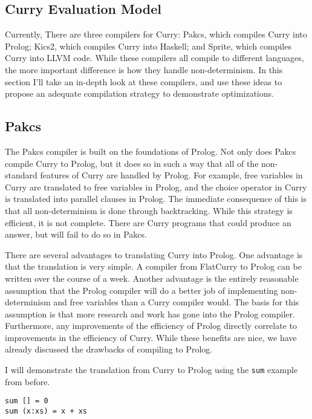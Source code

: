 
\subsection{Curry Evaluation Model}

Currently, There are three compilers for Curry:
Pakcs, which compiles Curry into Prolog;
Kics2, which compiles Curry into Haskell;
and Sprite, which compiles Curry into LLVM code.
While these compilers all compile to different languages,
the more important difference is how they handle non-determinism.
In this section I'll take an in-depth look at these compilers,
and use these ideas to propose an adequate compilation strategy
to demonstrate optimizations.

\subsection{Pakcs}

The Pakcs compiler is built on the foundations of Prolog.
Not only does Pakcs compile Curry to Prolog,
but it does so in such a way that all of the non-standard features 
of Curry are handled by Prolog.
For example, free variables in Curry are translated to free variables in Prolog,
and the choice operator in Curry is translated into parallel clauses in Prolog.
The immediate consequence of this is that all non-determinism is done through backtracking.
While this strategy is efficient, it is not complete.
There are Curry programs that could produce an answer, but will fail to do so in Pakcs.

There are several advantages to translating Curry into Prolog.
One advantage is that the translation is very simple.
A compiler from FlatCurry to Prolog can be written over the course of a week.
Another advantage is the entirely reasonable assumption that the Prolog compiler
will do a better job of implementing non-determinism and free variables than a Curry compiler would.
The basis for this assumption is that more research and work has gone into the Prolog compiler.
Furthermore, any improvements of the efficiency of Prolog directly correlate to improvements
in the efficiency of Curry.
While these benefits are nice, we have already discussed the drawbacks of compiling to Prolog.

I will demonstrate the translation from Curry to Prolog using the \texttt{sum} example from before.

\begin{verbatim}
sum [] = 0
sum (x:xs) = x + xs
\end{verbatim}

